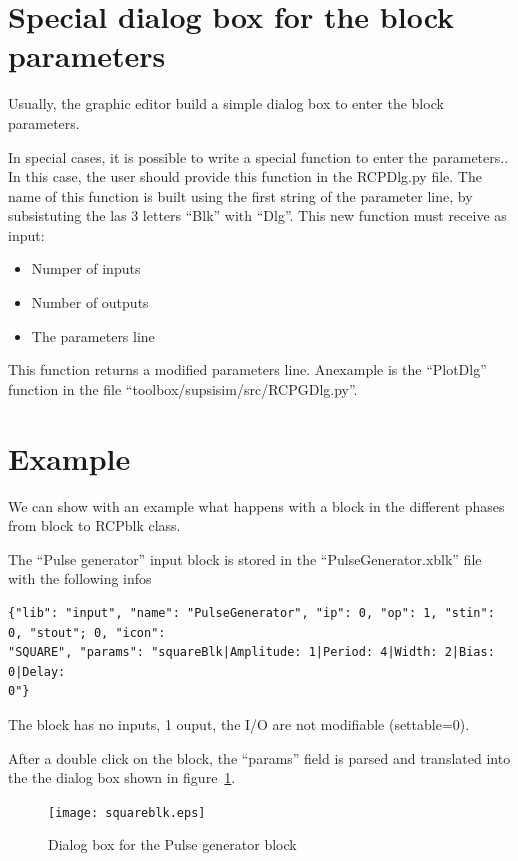 \section{Special dialog box for the block parameters}
Usually, the graphic editor build a simple dialog box to enter the block 
parameters. 

In special cases, it is possible to write a special function to 
enter the parameters.. In this case, the user should provide this function in 
the RCPDlg.py file.
The name of this function is built using the first string of the parameter 
line, by subsistuting the las 3 letters ``Blk'' with ``Dlg''. This new function 
must receive as input:

\begin{itemize}
\item Numper of inputs
\item Number of outputs
\item The parameters line
\end{itemize}

This function returns a modified parameters line. Anexample is the ``PlotDlg'' 
function in the file ``toolbox/supsisim/src/RCPGDlg.py''.

\section{Example}
We can show with an example what happens with a block in the different phases 
from block to RCPblk class.

The ``Pulse generator'' input block is stored in the ``PulseGenerator.xblk'' 
file with 
the following infos

\tiny
\begin{verbatim}
{"lib": "input", "name": "PulseGenerator", "ip": 0, "op": 1, "stin": 0, "stout"; 0, "icon": 
"SQUARE", "params": "squareBlk|Amplitude: 1|Period: 4|Width: 2|Bias: 0|Delay: 
0"}
\end{verbatim}
\normalsize

The block has no inputs, 1 ouput, the I/O are not modifiable (settable=0).

After a double click on the block, the ``params'' field is parsed and 
translated 
into the the dialog box shown in figure~\ref{Fig:squareblk}.

 \begin{figure}[htbp]	
 \centering
 \texttt{[image: squareblk.eps]}
 \caption{Dialog box for the Pulse generator block}
 \label{Fig:squareblk}
 \end{figure}

